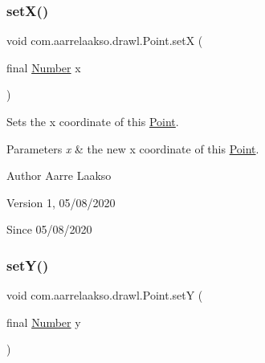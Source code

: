 \subsubsection{\texorpdfstring{set\+X()}{setX()}}
{\footnotesize\ttfamily void com.\+aarrelaakso.\+drawl.\+Point.\+setX (\begin{DoxyParamCaption}\item[{final \hyperlink{interfacecom_1_1aarrelaakso_1_1drawl_1_1_number}{Number}}]{x }\end{DoxyParamCaption})\hspace{0.3cm}{\ttfamily [protected]}}



Sets the x coordinate of this \hyperlink{classcom_1_1aarrelaakso_1_1drawl_1_1_point}{Point}. 


\begin{DoxyParams}{Parameters}
{\em x} & the new x coordinate of this \hyperlink{classcom_1_1aarrelaakso_1_1drawl_1_1_point}{Point}. \\
\hline
\end{DoxyParams}
\begin{DoxyAuthor}{Author}
Aarre Laakso 
\end{DoxyAuthor}
\begin{DoxyVersion}{Version}
1, 05/08/2020 
\end{DoxyVersion}
\begin{DoxySince}{Since}
05/08/2020 
\end{DoxySince}
\mbox{\label{classcom_1_1aarrelaakso_1_1drawl_1_1_point_a713f16e843349993ac2b79bc05b5aeb6}} 
\subsubsection{\texorpdfstring{set\+Y()}{setY()}}
{\footnotesize\ttfamily void com.\+aarrelaakso.\+drawl.\+Point.\+setY (\begin{DoxyParamCaption}\item[{final \hyperlink{interfacecom_1_1aarrelaakso_1_1drawl_1_1_number}{Number}}]{y }\end{DoxyParamCaption})\hspace{0.3cm}{\ttfamily [package]}}



